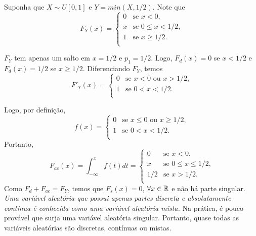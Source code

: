 \begin{frame}
\begin{exem}

Suponha que $X\sim U[0,1]$ e $Y=min(X,1/2)$. Note que
\[
F_Y(x)= \left\{
\begin{array}{ll}
0 & \mbox{se $x<0$,} \\
x & \mbox{se $0\leq x<1/2$,} \\
1 & \mbox{se $x\geq 1/2$.}\\
\end{array}
\right.
\]

$F_Y$ tem apenas um salto em $x=1/2$ e $p_1=1/2$. Logo, $F_d(x)=0$ se $x<1/2$ e $F_d(x)=1/2$ se $x\geq 1/2$. Diferenciando $F_Y$, temos
\[
F'_Y(x)= \left\{
\begin{array}{ll}
0 & \mbox{se $x<0$ ou $x>1/2$,} \\
1 & \mbox{se $0<x< 1/2$.}\\
\end{array}
\right.
\]


Logo, por definição,
\[
f(x)= \left\{
\begin{array}{ll}
0 & \mbox{se $x\leq 0$ ou $x\geq 1/2$,} \\
1 & \mbox{se $0<x< 1/2$.}\\
\end{array}
\right.
\]
Portanto,
\[
F_{ac}(x)= \int_{-\infty}^{x}f(t)dt=\left\{
\begin{array}{ll}
0 & \mbox{se $x< 0$,} \\
x & \mbox{se $0\leq x\leq 1/2$,} \\
1/2 & \mbox{se $x> 1/2$.}\\
\end{array}
\right.
\]
Como $F_d+F_{ac}=F_Y$, temos que $F_s(x)=0$, $\forall x\in\mathbb{R}$ e não há parte singular. {\em Uma variável aleatória que possui apenas partes discreta e absolutamente contínua é conhecida como uma variável aleatória mista.} Na prática, é pouco provável que surja uma variável aleatória singular. Portanto, quase todas as variáveis aleatórias são discretas, contínuas ou mistas.
\end{exem}
\end{frame}


